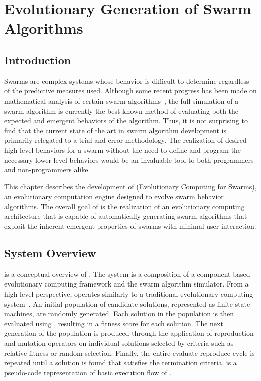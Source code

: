 \chapter{Evolutionary Generation of Swarm Algorithms}
\label{ch:EvolutionaryGeneration}

\section{Introduction}

Swarms are complex systems whose behavior is difficult to determine \apriori{} regardless of the predictive measures used.  Although some recent progress has been made on mathematical analysis of certain swarm algorithms~\cite{
couzin:CollectiveMemory, 
fax:InformationFlow, 
gazi:SwarmStability, 
grunbaum:InteractiveSwarms, 
huepe:ParticleClustering, 
jadbabaie:Coordination, 
marshall:VehicleFormations, 
paley:CollectiveMotion, 
parrish:FishSchools, 
toner:QuantitativeFlocking,
topaz:SwarmingPatterns, 
vicsek:PhaseTransition}, the full simulation of a swarm algorithm is currently the best known method of evaluating both the expected and emergent behaviors of the algorithm.  Thus, it is not surprising to find that the current state of the art in swarm algorithm development is primarily relegated to a trial-and-error methodology.  The realization of desired high-level behaviors for a swarm without the need to define and program the necessary lower-level behaviors would be an invaluable tool to both programmers and non-programmers alike.  

This chapter describes the development of \ECS (Evolutionary Computing for Swarms), an evolutionary computation engine designed to evolve swarm behavior algorithms.  The overall goal of \ECS is the realization of an evolutionary computing architecture that is capable of automatically generating swarm algorithms that exploit the inherent emergent properties of swarms with minimal user interaction.

\section{System Overview}

 is a conceptual overview of \ECS.  The system is a composition of a component-based evolutionary computing framework and the \SWEEP swarm algorithm simulator.  From a high-level perspective, \ECS operates similarly to a traditional evolutionary computing system~\cite{jholland:Adaptation}.  An initial population of candidate solutions, represented as finite state machines, are randomly generated.  Each  solution in the population is then evaluated using \SWEEP, resulting in a fitness score for each solution.  The next generation of the population is produced through the application of reproduction and mutation operators on individual solutions selected by criteria such as relative fitness or random selection.  Finally, the entire evaluate-reproduce cycle is repeated until a solution is found that satisfies the termination criteria.   is a pseudo-code representation of basic execution flow of \ECS{}.

